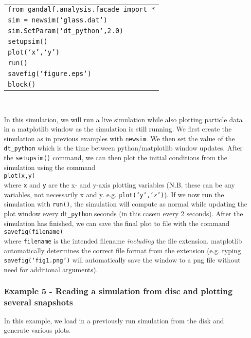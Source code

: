 \documentclass[a4paper]{article}
\newcommand{\var}[1]{\texttt{#1}}
\newcommand{\singlecommand}[1]{\\ \newline \indent \var{#1} \\ \newline \noindent}
\begin{document}
\begin{tabular}{p{14.0cm}}
\var{from gandalf.analysis.facade import *} \\
\var{sim = newsim(`glass.dat')} \\
\var{sim.SetParam(`dt\_python',2.0)} \\
\var{setupsim()} \\
\var{plot(`x',`y')} \\
\var{run()} \\
\var{savefig(`figure.eps')} \\
\var{block()} \\
\end{tabular} \\
\newline

\noindent In this simulation, we will run a live simulation while also plotting particle data in a matplotlib window as the simulation is still running.  We first create the simulation as in previous examples with \var{newsim}.  We then set the value of the \var{dt\_python} which is the time between python/matplotlib window updates.  After the \var{setupsim()} command, we can then plot the initial conditions from the simulation using the command \singlecommand{plot(x,y)} where \var{x} and \var{y} are the x- and y-axis plotting variables (N.B. these can be any variables, not necessarily x and y. e.g. \var{plot(`y',`z')}).  If we now run the simulation with \var{run()}, the simulation will compute as normal while updating the plot window every \var{dt\_python} seconds (in this casem every 2 seconds).  After the simulation has finished, we can save the final plot to file with the command \singlecommand{savefig(filename)} where \var{filename} is the intended filename {\it including} the file extension.  matplotlib automatically determines the correct file format from the extension  (e.g. typing \var{savefig(`fig1.png')} will automatically save the window to a png file without need for additional arguments).


\subsubsection{Example 5 - Reading a simulation from disc and plotting several snapshots}
In this example, we load in a previously run simulation from the disk and generate various plots. \\
\end{document}
